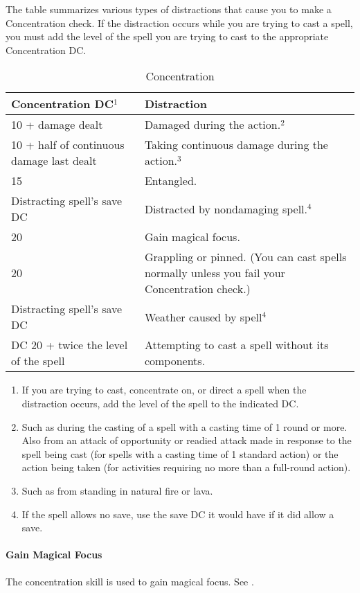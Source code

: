 The  table summarizes various types of distractions that cause you to make a Concentration check. 
If the distraction occurs while you are trying to cast a spell, 
you must add the level of the spell you are trying to cast to the appropriate Concentration DC. 
\begin{table*}
\centering
\caption{Concentration}
\label{tab:Concentration}
\begin{tabular}{|p{}|p{}|}
\hline
\textbf{Concentration DC$^1$}&\textbf{Distraction}\\
\hline
10 + damage dealt&Damaged during the action.$^2$\\
10 + half of continuous damage last dealt&Taking continuous damage during the action.$^3$\\
15&Entangled.\\
Distracting spell's save DC&Distracted by nondamaging spell.$^4$\\
20&Gain magical focus.\\
20&Grappling or pinned. (You can cast spells normally unless you fail your Concentration check.)\\
Distracting spell's save DC&Weather caused by spell$^4$\\
DC 20 + twice the level of the spell&Attempting to cast a spell without its components.\\
\hline
\end{tabular}
\begin{enumerate}
\item If you are trying to cast, concentrate on, or direct a spell when the distraction occurs, add the level of the spell to the indicated DC.
\item Such as during the casting of a spell with a casting time of 1 round or more. 
Also from an attack of opportunity or readied attack made in response to the spell being cast 
(for spells with a casting time of 1 standard action) or the action being taken (for activities requiring no more than a full-round action).
\item Such as from standing in natural fire or lava.
\item If the spell allows no save, use the save DC it would have if it did allow a save.
\end{enumerate}
\end{table*}

\paragraph{Gain Magical Focus}
The concentration skill is used to gain magical focus. See .
